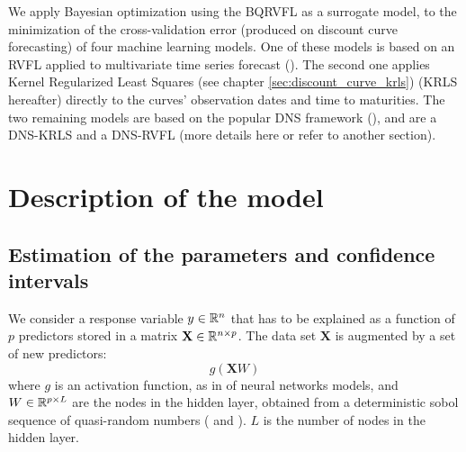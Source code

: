 We apply Bayesian optimization using the BQRVFL as a surrogate model, to the minimization of the cross-validation error (produced on discount curve forecasting) of four machine learning models. One of these models is based on an RVFL applied to multivariate time series forecast (\cite{moudiki2018multiple}). The second one applies Kernel Regularized Least Squares (see chapter \ref{sec:discount_curve_krls}) (KRLS hereafter) directly to the curves' observation dates and time to maturities. The two remaining models are based on the popular DNS framework (\cite{diebold2006forecasting}), and are a DNS-KRLS and a DNS-RVFL (more details here or refer to another section). 

\newpage

\section{Description of the model}
\label{sec:modelprez}

\subsection{Estimation of the parameters and confidence intervals}

We consider a response variable $y \in \mathbb{R}^n$ that has to be explained as a function of $p$ predictors stored in a matrix $\textbf{X} \in \mathbb{R}^{n \times p}$. The data set $\textbf{X}$ is augmented by a set of new predictors: 
$$
g \left(\textbf{X} W \right)
$$
where $g$ is an activation function, as in of neural networks models, and $W \in \mathbb{R}^{p \times L}$ are the nodes in the hidden layer, obtained from a deterministic sobol sequence of quasi-random numbers (\cite{niederreiter1992random} and \cite{boyle1997quasi}). $L$ is the number of nodes in the hidden layer. 

\medskip 

